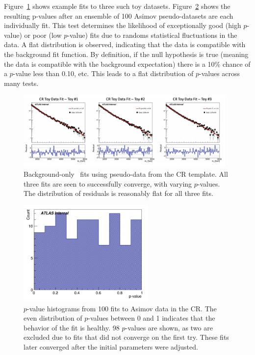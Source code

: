 Figure~\ref{fig:bkgfit_data} shows example fits to three such toy datasets.
Figure~\ref{fig:asimov_hist} shows the resulting p-values after an ensemble of 100 Asimov pseudo-datasets are each individually fit. 
This test determines the likelihood of exceptionally good (high $p$-value) or poor (low $p$-value) fits due to randoms statistical fluctuations in the data. 
A flat distribution is observed, indicating that the data is compatible with the background fit function. 
By definition, if the null hypothesis is true (meaning the data is compatible with the background expectation) there is a 10\% chance of a $p$-value less than 0.10, etc.
This leads to a flat distribution of $p$-values across many tests.

\begin{figure}[!htbp]
\centering
   \includegraphics[width=0.97\textwidth]{figures/stats/bkgfit_data_cr}
    \caption{Background-only \mt~fits using pseudo-data from the CR template. All three fits are seen to successfully converge, with varying $p$-values. The distribution of residuals is reasonably flat for all three fits.
     \label{fig:bkgfit_data}}
\end{figure}

\begin{figure}[!htbp]
\centering
   \includegraphics[width=0.6\textwidth]{figures/stats/asimov_cr_hist}
    \caption{$p$-value histograms from 100 fits to Asimov data in the CR. The even distribution of $p$-values between 0 and 1 indicates that the behavior of the fit is healthy. 98 $p$-values are shown, as two are excluded due to fits that did not converge on the first try. These fits later converged after the initial parameters were adjusted. %
    \label{fig:asimov_hist}}
\end{figure}

